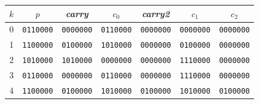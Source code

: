 \begin{tabular}{@{}c cccccc@{}}
\toprule
$k$ & $p$ & \textit{carry} & $c_0$ & \textit{carry2} & $c_1$ & $c_2$ \\
\midrule
0 & \texttt{0110000} & \texttt{0000000} & \texttt{0110000} & \texttt{0000000} & \texttt{0000000} & \texttt{0000000} \\
1 & \texttt{1100000} & \texttt{0100000} & \texttt{1010000} & \texttt{0000000} & \texttt{0100000} & \texttt{0000000} \\
2 & \texttt{1010000} & \texttt{1010000} & \texttt{0000000} & \texttt{0000000} & \texttt{1110000} & \texttt{0000000} \\
3 & \texttt{0110000} & \texttt{0000000} & \texttt{0110000} & \texttt{0000000} & \texttt{1110000} & \texttt{0000000} \\
4 & \texttt{1100000} & \texttt{0100000} & \texttt{1010000} & \texttt{0100000} & \texttt{1010000} & \texttt{0100000} \\
\bottomrule
\end{tabular}
